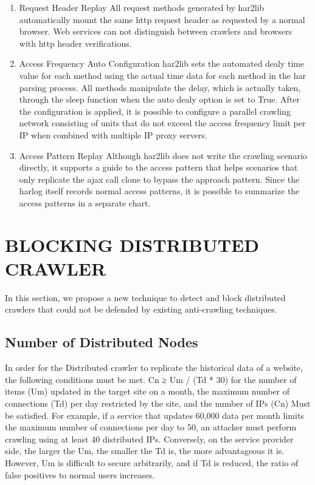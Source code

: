 \begin{enumerate}
\item Request Header Replay
\newline All request methods generated by har2lib automatically mount the same http request header as requested by a normal browser. Web services can not distinguish between crawlers and browsers with http header verifications.
\newline
\item Access Frequency Auto Configuration
\newline 
har2lib sets the automated dealy time value for each method using the actual time data for each method in the har parsing process. All methods manipulate the delay, which is actually taken, through the sleep function when the auto dealy option is set to True. After the configuration is applied, it is possible to configure a parallel crawling network consisting of units that do not exceed the access frequency limit per IP when combined with multiple IP proxy servers.
\newline
\item Access Pattern Replay
\newline
Although har2lib does not write the crawling scenario directly, it supports a guide to the access pattern that helps scenarios that only replicate the ajax call clone to bypass the approach pattern. Since the harlog itself records normal access patterns, it is possible to summarize the access patterns in a separate chart.
\end{enumerate}



%
%
\section{BLOCKING DISTRIBUTED CRAWLER}
In this section, we propose a new technique to detect and block distributed crawlers that could not be defended by existing anti-crawling techniques.

\subsection{Number of Distributed Nodes}
In order for the Distributed crawler to replicate the historical data of a website, the following conditions must be met. Cn ≥ Um / (Td * 30) for the number of items (Um) updated in the target site on a month, the maximum number of connections (Td) per day restricted by the site, and the number of IPs (Cn) Must be satisfied.
For example, if a service that updates 60,000 data per month limits the maximum number of connections per day to 50, an attacker must perform crawling using at least 40 distributed IPs. Conversely, on the service provider side, the larger the Um, the smaller the Td is, the more advantageous it is. However, Um is difficult to secure arbitrarily, and if Td is reduced, the ratio of false positives to normal users increases.


